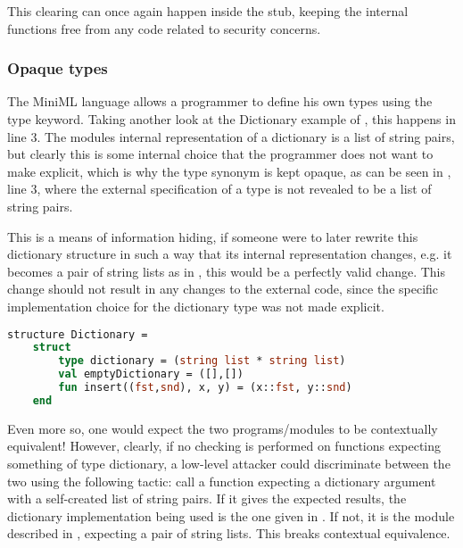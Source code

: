 This clearing can once again happen inside the stub, keeping the internal functions free from any code related to security concerns.

\subsubsection{Opaque types}

The \mbox{MiniML} language allows a programmer to define his own types using the type keyword. Taking another look at the Dictionary example of , this happens in line 3. The modules internal representation of a dictionary is a list of string pairs, but clearly this is some internal choice that the programmer does not want to make explicit, which is why the type synonym  is kept opaque, as can be seen in , line 3, where the external specification of a type is not revealed to be a list of string pairs.

This is a means of information hiding, if someone were to later rewrite this dictionary structure in such a way that its internal representation changes, e.g. it becomes a pair of string lists as in , this would be a perfectly valid change. This change should not result in any changes to the external code, since the specific implementation choice for the dictionary type was not made explicit.

\begin{lstlisting}[frame=single, language=ML, label={code:DictionaryStructureExample2},caption={[Alternative Dictionary Definition]An alternative structure defining a dictionary.}]
structure Dictionary =
    struct
        type dictionary = (string list * string list)
        val emptyDictionary = ([],[])
        fun insert((fst,snd), x, y) = (x::fst, y::snd)
    end
\end{lstlisting}

Even more so, one would expect the two programs/modules to be contextually equivalent! However, clearly, if no checking is performed on functions expecting something of type dictionary, a low-level attacker could discriminate between the two using the following tactic: call a function expecting a dictionary argument with a self-created list of string pairs. If it gives the expected results, the dictionary implementation being used is the one given in . If not, it is the module described in , expecting a pair of string lists. This breaks contextual equivalence.

